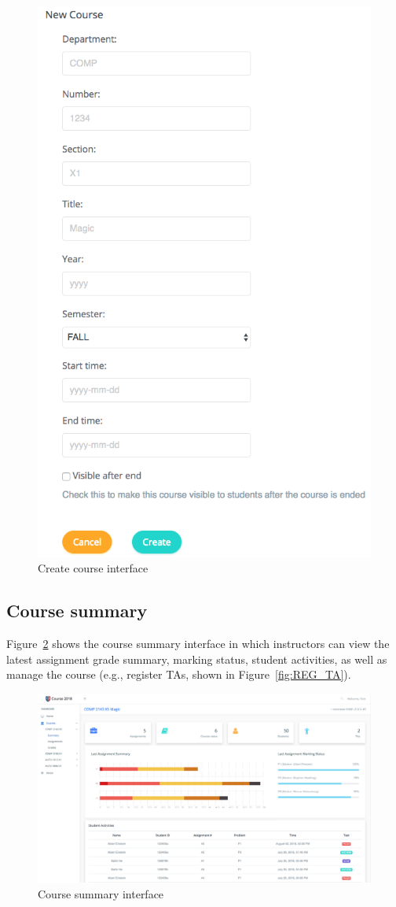 \begin{figure}[H]
    \centering
        \includegraphics[width=.6\textwidth]{figures/create-courses}
    \caption{Create course interface}
    \label{fig:NEW_COURSE}
\end{figure}

\subsection{Course summary}
Figure~\ref{fig:COURSE_SUMMARY} shows the course summary interface in which
instructors can view the latest assignment grade summary, marking status,
student activities, as well as manage the course (e.g., register TAs, shown
in Figure~\ref{fig:REG_TA}).

\begin{figure}[H]
    \centering
        \includegraphics[width=1.0\textwidth]{figures/course-summary}
    \caption{Course summary interface}
    \label{fig:COURSE_SUMMARY}
\end{figure}

